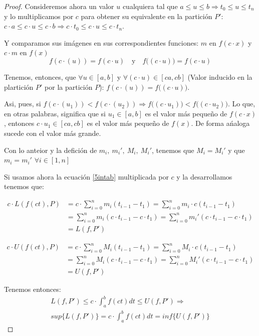 \documentclass[12pt]{article}
\begin{document}
\begin{proof}
    Consideremos ahora un valor $u$ cualquiera tal que \(a\leq u\leq b \Longrightarrow t_{0}\leq u\leq t_n\) y lo multiplicamos por $c$ para obtener su equivalente en la partici\'on $P'$: \(c\cdot a\leq c\cdot u\leq c\cdot b \Longrightarrow c\cdot t_{0}\leq c\cdot u\leq c\cdot t_n\).\bigskip

    Y comparamos sus im\'agenes en sus correspondientes funciones: $m$ en \(f(c\cdot x)\) y $c\cdot m$ en \(f(x)\)
    \[f(c\cdot (u))=f(c\cdot u) \quad \text{y}  \quad f\big((c\cdot u)\big)=f(c\cdot u)\]

    Tenemos, entonces, que \(\forall u\in[a,b]\) y \(\forall (c\cdot u) \in [ca,cb]\) (Valor inducido en la plartici\'on $P'$ por la partici\'on $P$): \(f(c\cdot (u))=f\big((c\cdot u)\big)\).\bigskip

    Asi, pues, si \(f(c\cdot (u_1))<f(c\cdot (u_2)) \Longrightarrow f\big((c\cdot u_1)\big)<f\big((c\cdot u_2)\big)\). Lo que, en otras palabras, significa que si \(u_1\in[a,b]\) es el valor m\'as pequeño de $f(c\cdot x)$, entonces \(c\cdot u_1\in[ca,cb]\) es el valor m\'as pequeño de $f(x)$. De forma a\'naloga sucede con el valor m\'as grande.\bigskip

    Con lo anteior y la defici\'on de \(m_i, \ m_i', \ M_i, \ M_i'\), tenemos que \(M_i=M_i'\) y que \(m_i=m_i'\) \(\forall i\in[1,n]\)

    Si usamos ahora la ecuaci\'on \eqref{5intab} multiplicada por $c$ y la desarrollamos tenemos que:

    \begin{align*}
        c\cdot L(f(ct),P) &= c \cdot \sum_{i=0}^n m_i(t_{i-1}-t_1) = \sum_{i=0}^n m_i\cdot c(t_{i-1}-t_1) \\
        &= \sum_{i=0}^n m_i(c\cdot t_{i-1}-c\cdot t_1) = \sum_{i=0}^n m_i'(c\cdot t_{i-1}-c\cdot t_1) \\
        &= L(f,P')
    \end{align*}

    \begin{align*}
        c\cdot U(f(ct),P) &= c \cdot \sum_{i=0}^n M_i(t_{i-1}-t_1) = \sum_{i=0}^n M_i\cdot c(t_{i-1}-t_1) \\
        &= \sum_{i=0}^n M_i(c\cdot t_{i-1}-c\cdot t_1) = \sum_{i=0}^n M_i'(c\cdot t_{i-1}-c\cdot t_1) \\
        &= U(f,P')
    \end{align*}

    Tenemos entonces:
    \begin{multline*}
        L(f,P')\leq c\cdot\int_{a}^{b}f(ct)dt\leq U(f,P') \Longrightarrow \\ sup\{L(f,P')\}=c\cdot\int_{a}^{b}f(ct)dt=inf\{U(f,P')\}
    \end{multline*}


\end{proof}
\end{document}
